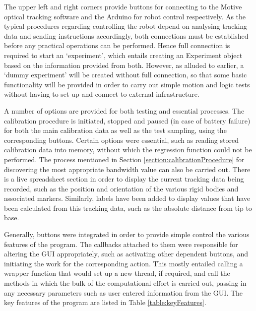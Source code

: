 \documentclass[11pt]{article}
\begin{document}
The upper left and right corners provide buttons for connecting to the Motive optical tracking software and the Arduino for robot control respectively. As the typical procedures regarding controlling the robot depend on analysing tracking data and sending instructions accordingly, both connections must be established before any practical operations can be performed. Hence full connection is required to start an `experiment', which entails creating an Experiment object based on the information provided from both. However, as alluded to earlier, a `dummy experiment' will be created without full connection, so that some basic functionality will be provided in order to carry out simple motion and logic tests without having to set up and connect to external infrastructure. 

A number of options are provided for both testing and essential processes. The calibration procedure is initiated, stopped and paused (in case of battery failure) for both the main calibration data as well as the test sampling, using the corresponding buttons. Certain options were essential, such as reading stored calibration data into memory, without which the regression function could not be performed. The process mentioned in Section \ref{section:calibrationProcedure} for discovering the most appropriate bandwidth value can also be carried out. There is a live spreadsheet section in order to display the current tracking data being recorded, such as the position and orientation of the various rigid bodies and associated markers. Similarly, labels have been added to display values that have been calculated from this tracking data, such as the absolute distance from tip to base. 

Generally, buttons were integrated in order to provide simple control the various features of the program. The callbacks attached to them were responsible for altering the GUI appropriately, such as activating other dependent buttons, and initiating the work for the corresponding action. This mostly entailed calling a wrapper function that would set up a new thread, if required, and call the methods in which the bulk of the computational effort is carried out, passing in any necessary parameters such as user entered information from the GUI. The key features of the program are listed in Table \ref{table:keyFeatures}.

\pagebreak
\end{document}
